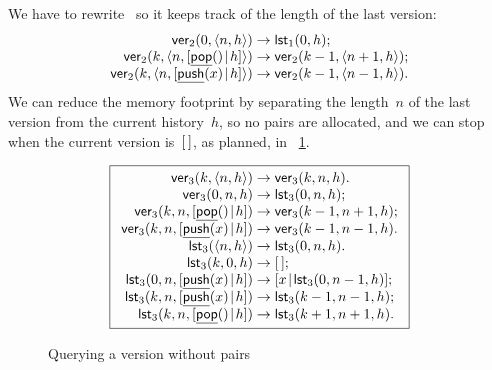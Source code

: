 We have to rewrite~ so it keeps
track of the length of the last version:
\begin{equation*}
\begin{array}{@{}r@{\;}l@{\;}l@{}}
\fun{ver}_2(0,\pair{n}{h}) & \rightarrow & \fun{lst}_1(0,h);\\
\fun{ver}_2(k,\pair{n}{\cons{\ufun{pop}()}{h}})
                      & \rightarrow & \fun{ver}_2(k-1,\pair{n+1}{h});\\
\fun{ver}_2(k,\pair{n}{\cons{\ufun{push}(x)}{h}})
                      & \rightarrow & \fun{ver}_2(k-1,\pair{n-1}{h}).
\end{array}
\end{equation*}
We can reduce the memory footprint by separating the
length~\(n\) of the last version from the current history~\(h\), so no
pairs are allocated, and we can stop when the current version
is~\([\,]\), as planned, in \fig~\ref{fig:ver_no_pair}.
\begin{figure}
\begin{equation*}
\boxed{%
\begin{array}{r@{\;}l@{\;}l}
\fun{ver}_3(k,\pair{n}{h}) & \rightarrow & \fun{ver}_3(k,n,h).\\
\fun{ver}_3(0,n,h) & \rightarrow & \fun{lst}_3(0,n,h);\\
\fun{ver}_3(k,n,\cons{\ufun{pop}()}{h})
                      & \rightarrow & \fun{ver}_3(k-1,n+1,h);\\
\fun{ver}_3(k,n,\cons{\ufun{push}(x)}{h})
                      & \rightarrow & \fun{ver}_3(k-1,n-1,h).\\
\fun{lst}_3(\pair{n}{h}) & \rightarrow & \fun{lst}_3(0,n,h).\\
\fun{lst}_3(k,0,h) & \rightarrow & \el;\\
\fun{lst}_3(0,n,\cons{\ufun{push}(x)}{h}) & \rightarrow
                      & \cons{x}{\fun{lst}_3(0,n-1,h)};\\
\fun{lst}_3(k,n,\cons{\ufun{push}(x)}{h}) & \rightarrow
                      & \fun{lst}_3(k-1,n-1,h);\\
\fun{lst}_3(k,n,\cons{\ufun{pop}()}{h}) & \rightarrow
                      & \fun{lst}_3(k+1,n+1,h).
\end{array}}
\end{equation*}
\caption{Querying a version without pairs\label{fig:ver_no_pair}}
\end{figure}

